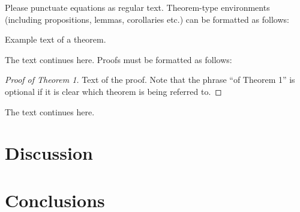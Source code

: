 \documentclass[journal,article,submit,pdftex,moreauthors]{Definitions/mdpi}
\begin{document}
Please punctuate equations as regular text. Theorem-type environments (including propositions, lemmas, corollaries etc.) can be formatted as follows:
\begin{Theorem}
Example text of a theorem.
\end{Theorem}

The text continues here. Proofs must be formatted as follows:

\begin{proof}[Proof of Theorem 1]
Text of the proof. Note that the phrase ``of Theorem 1'' is optional if it is clear which theorem is being referred to.
\end{proof}
The text continues here.

\section{Discussion}

\begin{comment}
Authors should discuss the results and how they can be interpreted from the perspective of previous studies and of the working hypotheses. The findings and their implications should be discussed in the broadest context possible. Future research directions may also be highlighted.
\end{comment}

\section{Conclusions}




\vspace{6pt} 


\end{document}
